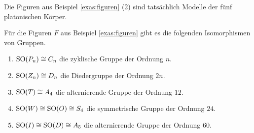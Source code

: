 \documentclass{book}
\begin{document}
\begin{prob}
    \label{prob:}
    Die Figuren aus Beispiel \ref{exas:figuren} (2) sind tatsächlich Modelle der fünf platonischen Körper. 
\end{prob}

\begin{prop}
    \label{prop:sym}
    Für die Figuren $F$ aus Beispiel \ref{exas:figuren} gibt es die folgenden Isomorphismen von Gruppen.
    \begin{enumerate}
        \item\label{it:sym1} ${\operatorname{SO}}(P_n) \cong C_n$ die zyklische Gruppe der Ordnung $n$.
        \item\label{it:sym2} ${\operatorname{SO}}(Z_n) \cong D_n$ die Diedergruppe der Ordnung $2n$.
        \item\label{it:sym3} ${\operatorname{SO}}(T) \cong A_4$ die alternierende Gruppe der Ordnung $12$.
        \item\label{it:sym4} ${\operatorname{SO}}(W) \cong {\operatorname{SO}}(O) \cong S_4$ die symmetrische Gruppe der Ordnung $24$. 
        \item\label{it:sym5} ${\operatorname{SO}}(I) \cong {\operatorname{SO}}(D) \cong A_5$ die alternierende Gruppe der Ordnung $60$. 
    \end{enumerate}
\end{prop}
\end{document}
